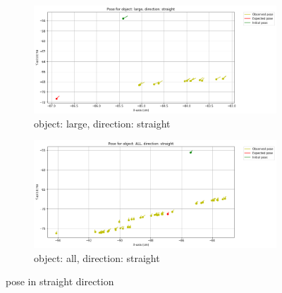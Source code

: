 \documentclass[10pt,a4paper]{article}
\begin{document}
\begin{itemize}
\begin{figure}[H]
									\begin{subfigure}{0.5\textwidth}
										\centering
										\includegraphics[width=0.8\linewidth]{img/pose_large_straight.png}
										\caption{object: large, direction: straight}
										\label{fig:object: large, direction: straight}
									\end{subfigure}%
									\begin{subfigure}{0.5\textwidth}
										\centering
										\includegraphics[width=0.8\linewidth]{img/pose_all_straight.png}
										\caption{object: all, direction: straight}
										\label{fig:object: all, direction: straight}
									\end{subfigure}
									
									\caption{pose in straight direction}
									\label{fig:pose in straight direction}
								\end{figure}
								

\end{itemize}
\end{document}
